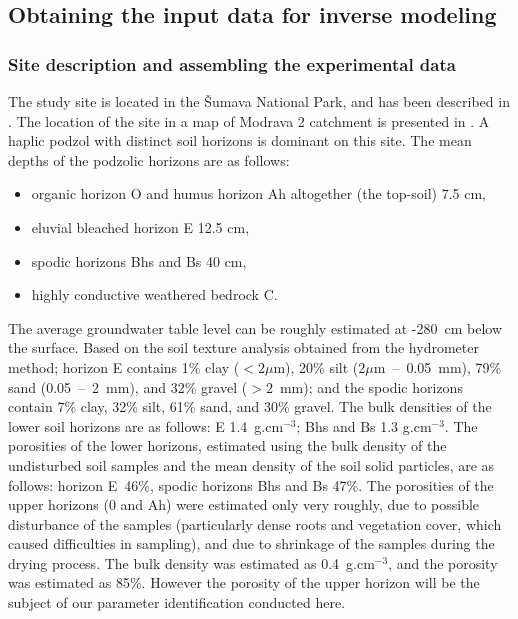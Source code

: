 \documentclass[review]{myarticle}
\begin{document}
\subsection{Obtaining the input data for inverse modeling}
\label{assamb}


\subsubsection{Site description and assembling the experimental data}%
\label{site}
The study site is located in the \v{S}umava National Park, and has been described in \citep{Jacka1}. The location of the site in a map of Modrava 2 catchment is presented in \citep{Jacka2}.
A haplic podzol with distinct soil horizons is dominant on this site. The mean depths of the podzolic horizons are as follows:
\begin{itemize}
\item organic horizon O and humus horizon Ah altogether (the top-soil) 7.5 cm, 
\item eluvial bleached horizon E 12.5 cm, 
\item spodic horizons Bhs and Bs 40 cm,
\item highly conductive weathered bedrock C.
\end{itemize}
The average groundwater table level can be roughly estimated at -280~cm below the surface. 
Based on the soil texture analysis obtained from the hydrometer method; horizon E contains 1\% clay ($<2\mu$m), 20\% silt ($ 2\mu$m~--~0.05~mm), 79\% sand (0.05~--~2~mm), and 32\% gravel  ($>2$~mm); and the spodic horizons contain 7\% clay, 32\% silt, 61\% sand, and 30\% gravel. The bulk densities of the lower soil horizons are as follows:
E 1.4~g.cm$^{-3}$; Bhs and Bs 1.3 g.cm$^{-3}$. The porosities of the lower horizons, estimated using the bulk density of the undisturbed soil samples and the mean density of the soil solid particles, are as follows: horizon E~46\%, spodic horizons Bhs and Bs 47\%. The porosities of the upper horizons (0 and Ah) were estimated only very roughly, due to  possible disturbance of the samples (particularly dense roots and vegetation cover, which caused difficulties in sampling), and due to shrinkage of the samples during the drying process. The bulk density was estimated as  0.4~g.cm$^{-3}$, and the porosity was estimated as 85\%. However the porosity of the upper horizon will be the subject of our parameter identification conducted here. 
\end{document}
